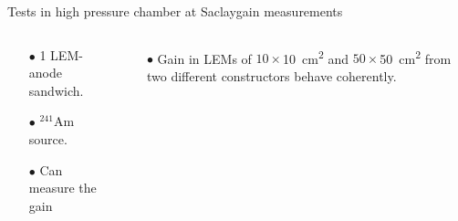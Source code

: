 \documentclass[10pt]{beamer}
\begin{document}
\begin{frame}{Tests in high pressure chamber at Saclay}{gain measurements}
\begin{scriptsize}
\begin{columns}
\begin{column}{0.38\textwidth}
    				\begin{itemize}
    					\item[$\bullet$] 1 LEM-anode sandwich.
    					\item[$\bullet$] $^{241}$Am source.
    					\item[$\bullet$] Can measure the gain
    				\end{itemize}
    			\end{column}\hfill
    			\begin{column}{0.58\textwidth}
    				\begin{itemize}
    					\item[$\bullet$] Gain in LEMs of $10\times$\SI{10}{\centi\meter\squared} and $50\times$\SI{50}{\centi\meter\squared} from two different constructors behave coherently.
    				\end{itemize}
    			\end{column}
    		\end{columns}
    	\end{scriptsize}
    \end{frame}
    
\end{document}
